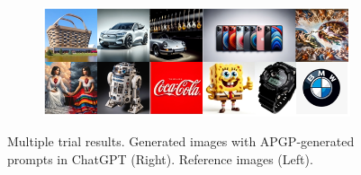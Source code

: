 \begin{figure}[ht]
    \centering
    \begin{subfigure}[t]{0.85\linewidth}
        \includegraphics[width=0.99\textwidth]{figure_folder/multiple_trial.png}
    \end{subfigure}
    \caption{Multiple trial results. Generated images with APGP-generated prompts in ChatGPT (Right). Reference images (Left).}
    \label{app:multiple_trials}
\end{figure}